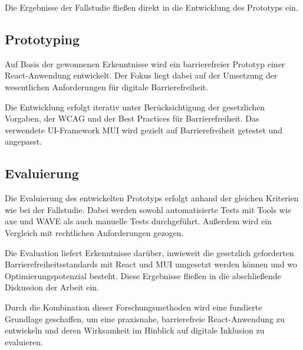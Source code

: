 Die Ergebnisse der Fallstudie fließen direkt in die Entwicklung des Prototyps ein.

\subsection{Prototyping} 

Auf Basis der gewonnenen Erkenntnisse wird ein barrierefreier Prototyp einer React-Anwendung entwickelt. Der Fokus liegt dabei auf der Umsetzung der wesentlichen Anforderungen für digitale Barrierefreiheit.

Die Entwicklung erfolgt iterativ unter Berücksichtigung der gesetzlichen Vorgaben, der WCAG und der Best Practices für Barrierefreiheit. Das verwendete UI-Framework MUI wird gezielt auf Barrierefreiheit getestet und angepasst.

\subsection{Evaluierung}

Die Evaluierung des entwickelten Prototyps erfolgt anhand der gleichen Kriterien wie bei der Fallstudie. Dabei werden sowohl automatisierte Tests mit Tools wie axe und WAVE als auch manuelle Tests durchgeführt. Außerdem wird ein Vergleich mit rechtlichen Anforderungen gezogen. 

Die Evaluation liefert Erkenntnisse darüber, inwieweit die gesetzlich geforderten Barrierefreiheitsstandards mit React und MUI umgesetzt werden können und wo Optimierungspotenzial besteht. Diese Ergebnisse fließen in die abschließende Diskussion der Arbeit ein.

Durch die Kombination dieser Forschungsmethoden wird eine fundierte Grundlage geschaffen, um eine praxisnahe, barrierefreie React-Anwendung zu entwickeln und deren Wirksamkeit im Hinblick auf digitale Inklusion zu evaluieren.

